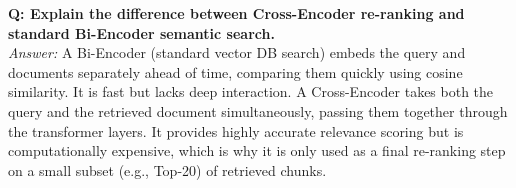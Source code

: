 \documentclass[12pt,a4paper,oneside]{book}
\begin{document}
\textbf{Q: Explain the difference between Cross-Encoder re-ranking and standard Bi-Encoder semantic search.} \\
\textit{Answer:} A Bi-Encoder (standard vector DB search) embeds the query and documents separately ahead of time, comparing them quickly using cosine similarity. It is fast but lacks deep interaction. A Cross-Encoder takes both the query and the retrieved document simultaneously, passing them together through the transformer layers. It provides highly accurate relevance scoring but is computationally expensive, which is why it is only used as a final re-ranking step on a small subset (e.g., Top-20) of retrieved chunks.
\end{document}
